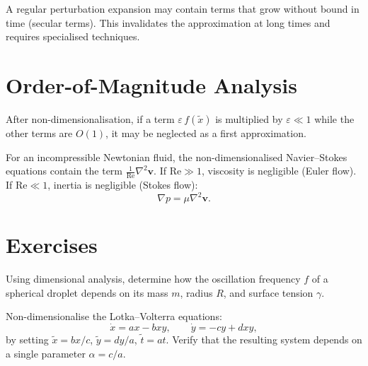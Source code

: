 \begin{warning}[title=\textbf{Secular terms}]
A regular perturbation expansion may contain terms that grow without
bound in time (secular terms).  This invalidates the approximation at
long times and requires specialised techniques.
\end{warning}

\section{Order-of-Magnitude Analysis}

\begin{proposition}
After non-dimensionalisation, if a term $\varepsilon\,f(\tilde{x})$ is
multiplied by $\varepsilon\ll 1$ while the other terms are $O(1)$,
it may be neglected as a first approximation.
\end{proposition}

\begin{example}
For an incompressible Newtonian fluid, the non-dimensionalised
Navier--Stokes equations contain the term
$\frac{1}{\mathrm{Re}}\nabla^2\mathbf{v}$.  If $\mathrm{Re}\gg 1$,
viscosity is negligible (Euler flow).  If $\mathrm{Re}\ll 1$, inertia
is negligible (Stokes flow):
\[
  \nabla p = \mu\nabla^2\mathbf{v}.
\]
\end{example}

\section{Exercises}

\begin{exercise}
Using dimensional analysis, determine how the oscillation frequency
$f$ of a spherical droplet depends on its mass $m$, radius $R$, and
surface tension $\gamma$.
\end{exercise}

\begin{exercise}
Non-dimensionalise the Lotka--Volterra equations:
\[
  \dot{x} = ax - bxy, \qquad \dot{y} = -cy + dxy,
\]
by setting $\tilde{x}=bx/c$, $\tilde{y}=dy/a$, $\tilde{t}=at$.
Verify that the resulting system depends on a single parameter
$\alpha = c/a$.
\end{exercise}

